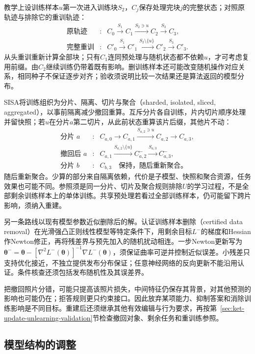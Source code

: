 教学上设训练样本$u$第一次进入训练块$S_2$，$C_j$保存处理完块$j$的完整状态；对照原轨迹与排除它的重训轨迹：
\[
\begin{array}{rcl}
\text{原轨迹}&:&
C_0\xrightarrow{S_1}C_1
\xrightarrow{S_2\ni u}C_2
\xrightarrow{S_3}C_3,\\
\text{完整重训}&:&
C'_0\xrightarrow{S_1}C'_1
\xrightarrow{S_2\setminus\{u\}}C'_2
\xrightarrow{S_3}C'_3.
\end{array}
\]
从头重训重新计算全部块；只有$C_1$连同预处理与随机状态都不依赖$u$，才可考虑复用前缀。由$C_2$继续训练仍带着既有影响。删训练样本还可能改变随机操作对应关系，相同种子不保证逐步对齐；验收须说明比较一次结果还是算法返回的模型分布。

SISA将训练组织为分片、隔离、切片与聚合（sharded, isolated, sliced, aggregated），以事前隔离减少撤回重算。互斥分片各自训练，片内切片顺序处理并留快照；若$u$在分片$a$第二切片，从此前状态重算该片后缀，其他片不动：
\[
\begin{array}{rcl}
\text{分片 }a&:&
C_{a,0}\to C_{a,1}
\xrightarrow{S_{a,2}\ni u}C_{a,2}\to C_{a,3},\\
\text{撤回后 }a&:&
C_{a,1}\xrightarrow{S_{a,2}\setminus\{u\}}C^-_{a,2}
\xrightarrow{S_{a,3}}C^-_{a,3},\\
\text{分片 }b&:&C_{b,3}\quad\text{保持，随后重新聚合。}
\end{array}
\]
随后重新聚合。少算的部分来自隔离依赖，代价是子模型、快照和聚合资源，任务效果也可能不同。参照须是同一分片、切片及聚合规则排除$U$的学习过程，不是全部剩余训练样本上的单体训练。共享预处理若看过全部训练样本，仍可能留下跨片影响，须纳入重建。

另一条路线以现有模型参数近似删除后的解。认证训练样本删除（certified data removal）在光滑强凸正则线性模型等特定条件下，用剩余目标$L^-$的梯度和Hessian作Newton修正，再将残差界与预先加入的随机扰动相连。一步Newton更新写为$\bm\theta^-=\bm\theta-[\nabla^2L^-(\bm\theta)]^{-1}\nabla L^-(\bm\theta)$，须保证曲率可逆并控制近似误差。小残差只支持优化接近，不独立提供发布分布保证；任意神经网络的反向更新不能沿用认证。条件核查还须包括发布随机性及其误差界。

把撤回照片分错，可能只提高该照片损失，中间特征仍保存其背景，对其他预测的影响也可能仍在；拒答规则更只约束接口。因此放弃某项能力、抑制答案和消除训练影响是不同目标。重建后还须继承其他有效编辑与行为要求，再按第~\ref{sec:ket-update-unlearning-validation}节检查撤回对象、剩余任务和重训练参照。

\subsection{模型结构的调整}
\label{sec:ket-update-structure}


